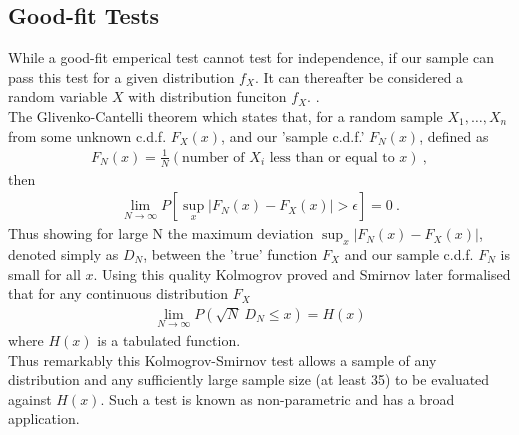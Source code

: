 \documentclass{article}
\begin{document}
\subsection{Good-fit Tests}

While a good-fit emperical test cannot test for independence, if our sample can pass
this test for a given distribution $f_X$. It can thereafter be considered a random variable 
$X$ with distribution funciton $f_X$. \cite{HELLEKALEK1998485}.  
\\
The Glivenko-Cantelli theorem which states that,
for a random sample  $X_{1},\dots,X_{n}$ from some unknown c.d.f. $F_X(x)$,
and our 'sample c.d.f.' $F_N(x)$, defined as 
\begin{align}
F_{N}(x)=\frac{1}{N}(\text{number of $X_{i}$ less than or equal to $x$}) ~,
\end{align}
then
\begin{align}
\lim_{ N \to \infty } P\left[\sup_{x} |F_{N}(x)-F_{X}(x)|>\epsilon\right]  = 0 ~.
\end{align}
Thus showing for large N the maximum deviation
$\sup_{x} |F_{N}(x)-F_{X}(x)|$,
denoted simply as $D_N$, between the 'true' function $F_X$ and our sample c.d.f. $F_N$ is small 
for all $x$. 
Using this quality Kolmogrov proved and Smirnov later formalised that for any continuous
distribution $F_X$
\begin{align}
\lim_{ N \to \infty } P(\sqrt{ N }~D_{N}\leq x)=H(x)
\end{align}
where $H(x)$ is a tabulated function. 
\\
Thus remarkably this Kolmogrov-Smirnov test allows a sample of any distribution and any 
sufficiently large sample size (at least 35) to be evaluated against $H(x)$. Such 
a test is known as non-parametric and has a broad application. \cite{alma9954732790001381}
\end{document}
